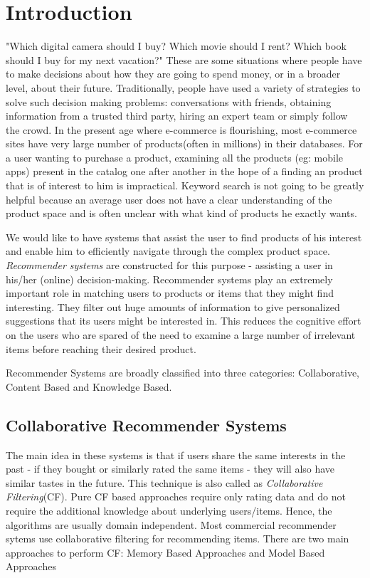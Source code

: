 
\chapter{Introduction}
\label{chap:intro}
"Which digital camera should I buy? Which movie should I rent? Which book should I buy for my next vacation?" These are some situations where people have to make decisions about how they are going to spend money, or in a broader level, about their future.
Traditionally, people have used a variety of strategies to solve such decision making problems: conversations with friends, obtaining information from a trusted third party, hiring an expert team or simply follow the crowd. 
In the present age where e-commerce is flourishing, most e-commerce sites have very large number of products(often in millions) in their databases.
For a user wanting to purchase a product, examining all the products (eg: mobile apps) present in the catalog one after another in the hope of a finding an product that is of interest to him is impractical.
Keyword search is not going to be greatly helpful because an average user does not have a clear understanding of the product space and is often unclear with what kind of products he exactly wants.

We would like to have systems that assist the user to find products of his interest and enable him to efficiently navigate through the complex product space.
\textit{Recommender systems} are constructed for this purpose - assisting a user in his/her (online) decision-making.
Recommender systems play an extremely important role in matching users to products or items that they might find interesting. 
They filter out huge amounts of information to give personalized suggestions that its users might be interested in. 
This reduces the cognitive effort on the users who are spared of the need to examine a large number of irrelevant items before reaching their desired product.

Recommender Systems are broadly classified into three categories: Collaborative, Content Based and Knowledge Based.

\section{Collaborative Recommender Systems}
\label{sec:CF}
 The main idea in these systems is that if users share the same interests in the past - if they bought or similarly rated the same items - they will also have similar tastes in the future. 
This technique is also called as \textit{Collaborative Filtering}(CF). 
Pure CF based approaches require only rating data and do not require the additional knowledge about underlying users/items. 
Hence, the algorithms are usually domain independent. Most commercial recommender sytems use collaborative filtering for recommending items.
There are two main approaches to perform CF: Memory Based Approaches and Model Based Approaches

